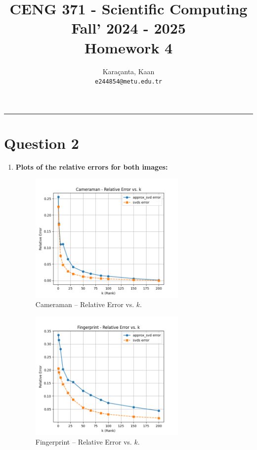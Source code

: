 \documentclass[11pt,a4paper, margin=1in]{article}
\author{
  Karaçanta, Kaan\\
  \texttt{e244854@metu.edu.tr}
}
\title{CENG 371 - Scientific Computing \\
Fall' 2024 - 2025 \\
Homework 4}
\date{}
\begin{document}
\maketitle

\noindent\rule{19cm}{1.2pt}

\section*{Question 2}

\begin{enumerate}
    
    \item 
    \textbf{Plots of the relative errors for both images:}

    \begin{figure}[H]
        \centering
        \includegraphics[width=0.72\textwidth]{Cameraman_relative_error_vs_k.png}
        \caption{Cameraman -- Relative Error vs. $k$.}
        \label{fig:relerr_cam}
    \end{figure}

    \begin{figure}[H]
        \centering
        \includegraphics[width=0.72\textwidth]{Fingerprint_relative_error_vs_k.png}
        \caption{Fingerprint -- Relative Error vs. $k$.}
        \label{fig:relerr_fpt}
    \end{figure}
    

\end{enumerate}
\end{document}
